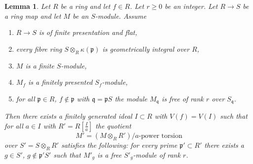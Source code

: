 \documentclass{amsart}
\theoremstyle{plain}
\newtheorem{lemma}[subsection]{Lemma}
\theoremstyle{definition}
\theoremstyle{remark}
\numberwithin{equation}{subsection}
\begin{document}
\begin{lemma}
\label{lemma-helper-blowup-affine-space}
Let $R$ be a ring and let $f \in R$. Let $r\geq 0$ be an integer.
Let $R \to S$ be a ring map and let $M$ be an $S$-module. Assume
\begin{enumerate}
\item $R \to S$ is of finite presentation and flat,
\item every fibre ring $S \otimes_R \kappa(\mathfrak p)$ is
geometrically integral over $R$,
\item $M$ is a finite $S$-module,
\item $M_f$ is a finitely presented $S_f$-module,
\item for all $\mathfrak p \in R$, $f \not \in \mathfrak p$ with
$\mathfrak q = \mathfrak pS$ the module $M_{\mathfrak q}$ is free
of rank $r$ over $S_\mathfrak q$.
\end{enumerate}
Then there exists a finitely generated ideal $I \subset R$ with
$V(f) = V(I)$ such that for all $a \in I$ with $R' = R[\frac{I}{a}]$
the quotient
$$
M' = (M \otimes_R R')/a\text{-power torsion}
$$
over $S' = S \otimes_R R'$ satisfies the following: for every prime
$\mathfrak p' \subset R'$ there exists a $g \in S'$,
$g \not \in \mathfrak p'S'$ such that $M'_g$ is a free $S'_g$-module
of rank $r$.
\end{lemma}
\end{document}
